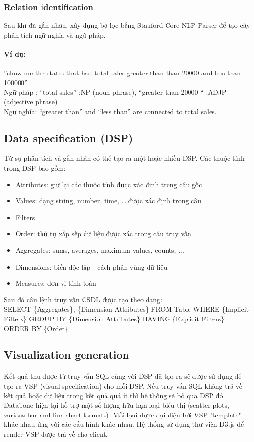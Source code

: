 \documentclass[12pt]{report}
\begin{document}
\subsubsection{Relation identification}
Sau khi đã gắn nhãn, xây dựng bộ lọc bằng Stanford Core NLP Parser để tạo cây phân tích ngữ nghĩa và ngữ pháp.
\paragraph*{Ví dụ:}
 ”show me the states that had total sales greater than than 20000 and less than 100000”
 \\
 Ngữ pháp : “total sales” :NP (noun phrase), “greater than 20000 “ :ADJP (adjective phrase)
 \\
 Ngữ nghĩa: “greater than” and “less than” are connected to total sales.
 
\subsection{Data specification (DSP)}
Từ sự phân tích và gắn nhãn có thể tạo ra một hoặc nhiều DSP. Các thuộc tính trong DSP bao gồm:
\begin{itemize}
	\item Attributes: giữ lại các thuộc tính được xác đinh trong câu gốc 
	\item Values: dạng string, number, time, … được xác định trong câu
	\item Filters 
	\item Order: thứ tự xắp sếp dữ liệu được xác trong câu truy vấn
	\item Aggregates: sums, averages, maximum values, counts, ...
	\item Dimensions: biến độc lập - cách phân vùng dữ liệu
	\item Measures: đơn vị tính toán 
\end{itemize}
Sau đó câu lệnh truy vấn CSDL được tạo theo dạng:\\
SELECT \{Aggregates\}, \{Dimension Attributes\} FROM Table WHERE \{Implicit Filters\} GROUP BY \{Dimension Attributes\} HAVING \{Explicit Filters\} ORDER BY \{Order\}
\subsection{Visualization generation}
\paragraph*{}
Kết quả thu được từ truy vấn SQL cùng với DSP đã tạo ra sẽ được sử dụng để tạo ra VSP (visual specification) cho mỗi DSP. Nếu truy vấn SQL không trả về kết quả hoặc dữ liệu trong kết quả quá ít thì hệ thống sẽ bỏ qua DSP đó. DataTone hiện tại hỗ trợ một số lượng hữu hạn loại biểu thị (scatter plots, various bar and line chart formats). Mỗi lọai được đại diện bởi VSP "template" khác nhau ứng với các cấu hình khác nhau. Hệ thống sử dụng thư viện D3.js để render VSP được trả về cho client.
\end{document}
